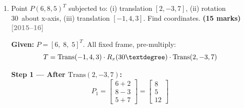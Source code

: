 \documentclass[12pt,a3paper]{article}
\newcommand{\yr}[1]{\hfill\textcolor{gray}{\small\textbf{[#1]}}}
\newcommand{\mk}[1]{\textcolor{orange!70!black}{\small\textbf{(#1 marks)}}}
\begin{document}
\begin{enumerate}
\begin{tcolorbox}[enhanced,breakable,ansbox,colback=cD!4,colframe=cD,
  boxrule=0.8pt,arc=5pt,
  title={\textbf{Answer}},fonttitle=\bfseries\color{white},colbacktitle=cD]
\[
  P' = \begin{bmatrix}0&0&1\\0&1&0\\-1&0&0\end{bmatrix}
  \begin{bmatrix}1\\4\\9\end{bmatrix}
  = \begin{bmatrix}9\\4\\-1\end{bmatrix}
\]

\[
  \boxed{P' = \begin{bmatrix}9\\4\\-1\end{bmatrix}}
\]

\textit{All values are exact integers in this case, which provides a
good self-check.}

\end{tcolorbox}

\item \label{qlabel:C4-Q4}
Point $P(6,8,5)^T$ subjected to: (i) translation $[2,-3,7]$,
(ii) rotation 30\textdegree\ about x-axis, (iii) translation
$[-1,4,3]$. Find coordinates. \mk{15}
\yr{2015--16}

\begin{tcolorbox}[enhanced,breakable,ansbox,colback=cD!4,colframe=cD,
  boxrule=0.8pt,arc=5pt,
  title={\textbf{Answer}},fonttitle=\bfseries\color{white},colbacktitle=cD]

\textbf{Given:} $P = [6,\;8,\;5]^T$. All fixed frame, pre-multiply:
\[
  T = \mathrm{Trans}(-1,4,3)\cdot R_x(30\textdegree)\cdot\mathrm{Trans}(2,-3,7)
\]

\textbf{Step 1 — After $\mathrm{Trans}(2,-3,7)$:}
\[
  P_1 = \begin{bmatrix}6+2\\8-3\\5+7\end{bmatrix} = \begin{bmatrix}8\\5\\12\end{bmatrix}
\]


\end{tcolorbox}
\end{enumerate}
\end{document}
